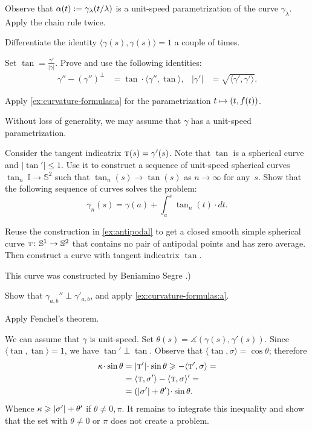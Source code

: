 \begin{multicols}{2}
Observe that $\alpha(t)\mathrel{:=}\gamma_{\lambda}(t/\lambda)$ is a unit-speed parametrization of the curve $ \gamma_{\lambda}$.
Apply the chain rule twice.


 Differentiate the identity $\langle\gamma(s),\gamma(s)\rangle=1$ a couple of times.

Set $\tan=\tfrac{\gamma'}{|\gamma|}$.
Prove and use the following identities: 
\begin{align*}
\gamma''-(\gamma'')^\perp&=\tan\cdot\langle\gamma'',\tan\rangle,
&
|\gamma'|&=\sqrt{\langle \gamma',\gamma'\rangle}.
\end{align*}

Apply \ref{ex:curvature-formulas:a} for the parametrization $t\z\mapsto (t,f(t))$.

Without loss of generality, we may assume that $\gamma$ has a unit-speed parametrization.

Consider the tangent indicatrix $\tan(s)\z=\gamma'(s)$.
Note that $\tan$ is a spherical curve and $|\tan'|\le 1$.
Use it to construct a sequence of unit-speed spherical curves $\tan_n\:\mathbb{I}\to\mathbb{S}^2$ such that $\tan_n(s)\to \tan(s)$ as $n\to\infty$ for any~$s$.
Show that the following sequence of curves solves the problem:
\[\gamma_n(s)=\gamma(a)+\int_a^s\tan_n(t)\cdot dt.\]

Reuse the construction in \ref{ex:antipodal} to get a closed smooth simple spherical curve $\tan\:\mathbb{S}^1\z\to\mathbb{S}^2$ that contains no pair of antipodal points and has zero average.
Then construct a curve with tangent indicatrix $\tan$.

 This curve was constructed by Beniamino Segre \cite{segre}.)

Show that $\gamma_{a,b}''\perp \gamma'_{a,b}$, and apply \ref{ex:curvature-formulas:a}.

 Apply Fenchel's theorem.

We can assume that $\gamma$ is unit-speed.
Set $\theta(s)=\measuredangle(\gamma(s),\gamma'(s))$.
Since $\langle\tan,\tan\rangle=1$, we have $\tan'\perp \tan$.
Observe that $\langle \tan,\sigma\rangle=\cos\theta$;
therefore
\begin{align*}
\kur\cdot \sin\theta
&=|\tan'|\cdot \sin\theta\ge
-\langle \tan',\sigma\rangle=
\\
&=
\langle \tan,\sigma'\rangle-\langle \tan,\sigma\rangle'=
\\
&=
(|\sigma'|+\theta')\cdot \sin\theta.
\end{align*}
Whence $\kappa\geqslant |\sigma'|+\theta'$
if $\theta\ne0,\pi$.
It remains to integrate this inequality and show that the set with $\theta\ne0$ or $\pi$ does not create a problem.


\end{multicols}
